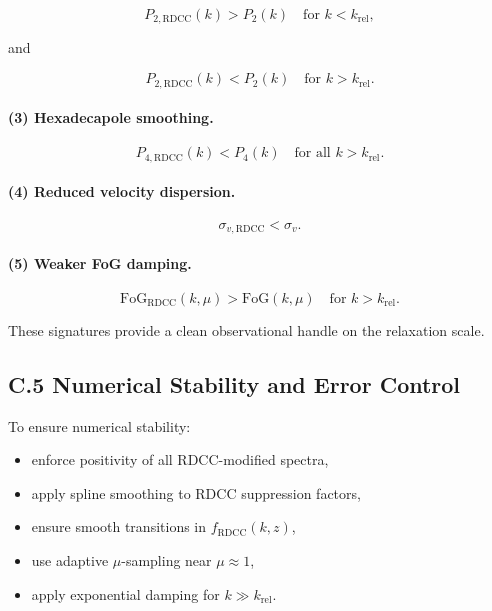 \documentclass[11pt,a4paper]{article}
\begin{document}
\[
P_{2,\mathrm{RDCC}}(k)
>
P_{2}(k)
\quad \text{for } k < k_{\mathrm{rel}},
\]


and


\[
P_{2,\mathrm{RDCC}}(k)
<
P_{2}(k)
\quad \text{for } k > k_{\mathrm{rel}}.
\]



\paragraph{(3) Hexadecapole smoothing.}


\[
P_{4,\mathrm{RDCC}}(k)
<
P_{4}(k)
\quad \text{for all } k > k_{\mathrm{rel}}.
\]



\paragraph{(4) Reduced velocity dispersion.}


\[
\sigma_{v,\mathrm{RDCC}} < \sigma_{v}.
\]



\paragraph{(5) Weaker FoG damping.}


\[
\mathrm{FoG}_{\mathrm{RDCC}}(k,\mu)
>
\mathrm{FoG}(k,\mu)
\quad \text{for } k > k_{\mathrm{rel}}.
\]



These signatures provide a clean observational handle on the relaxation scale.

\subsection*{C.5 Numerical Stability and Error Control}

To ensure numerical stability:

\begin{itemize}
\item enforce positivity of all RDCC-modified spectra,
\item apply spline smoothing to RDCC suppression factors,
\item ensure smooth transitions in $f_{\mathrm{RDCC}}(k,z)$,
\item use adaptive $\mu$-sampling near $\mu \approx 1$,
\item apply exponential damping for $k \gg k_{\mathrm{rel}}$.
\end{itemize}
\end{document}
